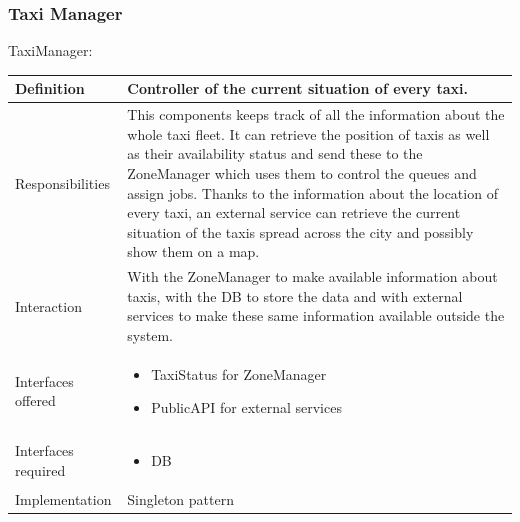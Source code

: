 \documentclass[a4paper,11pt]{report} %
\begin{document}
	\pagebreak
	\subsubsection{Taxi Manager}
	\begin{minipage}{\linewidth}
	\end{minipage} \linebreak
	\centerline{TaxiManager:}
	\begin{center}
		\begin{tabular}{| l | p{9cm} |}\hline
			Definition & Controller of the current situation of every taxi.\\\hline
			Responsibilities & This components keeps track of all the information about the whole taxi fleet. It can retrieve the position of taxis as well as their availability status and send these to the ZoneManager which uses them to control the queues and assign jobs. Thanks to the information about the location of every taxi, an external service can retrieve the current situation of the taxis spread across the city and possibly show them on a map.\\\hline
			Interaction & With the ZoneManager to make available information about taxis, with the DB to store the data and with external services to make these same information available outside the system.\\\hline
			Interfaces offered & \begin{itemize}
				\item TaxiStatus for ZoneManager
				\item PublicAPI for external services
			\end{itemize}\\\hline
			Interfaces required & \begin{itemize}
				\item DB
			\end{itemize}\\\hline
			Implementation & Singleton pattern\\\hline
		\end{tabular}
	\end{center}	
	
\end{document}
